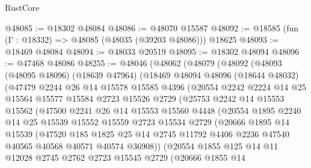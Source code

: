 \begin{lexlean}{RustCore}
\begin{coremodule}
@48085 := @18302 @48084
@48086 := @48070 @15587
@48092 := @18585 (fun (Γ : @18332) => @48085 (@48035 (@39203 @48086))) @18625
@48093 := @18469 @48084
@48094 := @48033 @20519
@48095 := @18302 @48094
@48096 := @47468 @48086
@48255 := @48046
    (@48062
      (@48079
        (@48092
          (@48093
            (@48095 @48096)
            (@18639 @47964)
            (@18469
              @48094
              @48096
              (@18644 @48032)
              (@47479
                @2244
                @26
                @14
                @15578
                @15585
                @4396
                (@20554
                  @2242
                  @2224
                  @14
                  @25
                  @15564
                  @15577
                  @15584
                  @2723
                  @15526
                  @2729
                  (@25753
                    @2242
                    @14
                    @15553
                    @15562
                    (@47500
                      @2241
                      @26
                      @14
                      @15553
                      @15560
                      @4448
                      (@20554
                        @1895
                        @2240
                        @14
                        @25
                        @15539
                        @15552
                        @15559
                        @2723
                        @15534
                        @2729
                        (@20666
                          @1895
                          @14
                          @15539
                          (@47520
                            @185
                            @1825
                            @25
                            @14
                            @2745
                            @11792
                            @4406
                            @2236
                            @47540
                            @40565
                            @40568
                            @40571
                            @40574
                            @36908))
                        (@20554
                          @1855
                          @125
                          @14
                          @11
                          @12028
                          @2745
                          @2762
                          @2723
                          @15545
                          @2729
                          (@20666
                            @1855
                            @14

\end{coremodule}
\end{lexlean}
